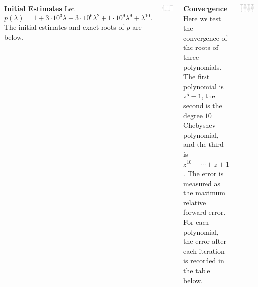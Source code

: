 \documentclass[20 pt, a0paper, portrait]{tikzposter}
\begin{document}
\begin{columns}
	{
	\textbf{Initial Estimates} Let
	\[
	p(\lambda)=1+3\cdot10^{3}\lambda+3\cdot10^{6}\lambda^{2}+1\cdot10^{9}\lambda^{9}+\lambda^{10}.
	\] 
	The initial estimates and exact roots of $p$ are below.
	\begin{tikzfigure}
	\centering
	\includegraphics[scale=0.85]{../tests/figures/init_est_acc.png}
	\end{tikzfigure}
	
	\textbf{Convergence} Here we test the convergence of the roots of three polynomials. The first polynomial is $z^{5}-1$, the second is the degree $10$ Chebyshev polynomial, and the third is $z^{10}+\cdots+z+1$. The error is measured as the maximum relative forward error. For each polynomial, the error after each iteration is recorded in the table below.
	\vspace*{-2em}
	\begin{tikzfigure}
	\centering
	\includegraphics[scale=0.60]{../tests/figures/conv.png}
	\end{tikzfigure}
	}
 \end{columns}
\end{document}
